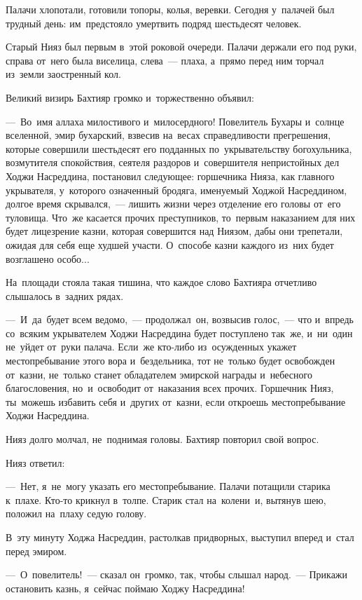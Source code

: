 \documentclass[12pt,a4paper]{book}
\begin{document}
Палачи хлопотали, готовили топоры, колья, веревки. Сегодня у~палачей был трудный день: им~предстояло умертвить подряд шестьдесят человек.

Старый Нияз был первым в~этой роковой очереди. Палачи держали его под руки, справа от~него была виселица, слева~— плаха, а~прямо перед ним торчал из~земли заостренный кол.

Великий визирь Бахтияр громко и~торжественно объявил:

—~Во~имя аллаха милостивого и~милосердного! Повелитель Бухары и~солнце вселенной, эмир бухарский, взвесив на~весах справедливости прегрешения, которые совершили шестьдесят его подданных по~укрывательству богохульника, возмутителя спокойствия, сеятеля раздоров и~совершителя непристойных дел Ходжи Насреддина, постановил следующее: горшечника Нияза, как главного укрывателя, у~которого означенный бродяга, именуемый Ходжой Насреддином, долгое время скрывался,~— лишить жизни через отделение его головы от~его туловища. Что~же касается прочих преступников, то~первым наказанием для них будет лицезрение казни, которая совершится над Ниязом, дабы они трепетали, ожидая для себя еще худшей участи. О~способе казни каждого из~них будет возглашено особо...

На~площади стояла такая тишина, что каждое слово Бахтияра отчетливо слышалось в~задних рядах.

—~И~да~будет всем ведомо,~— продолжал~он, возвысив голос,~— что и~впредь со~всяким укрывателем Ходжи Насреддина будет поступлено так~же, и~ни~один не~уйдет от~руки палача. Если~же кто-либо из~осужденных укажет местопребывание этого вора и~бездельника, тот не~только будет освобожден от~казни, не~только станет обладателем эмирской награды и~небесного благословения, но~и~освободит от~наказания всех прочих. Горшечник Нияз, ты~можешь избавить себя и~других от~казни, если откроешь местопребывание Ходжи Насреддина.

Нияз долго молчал, не~поднимая головы. Бахтияр повторил свой вопрос.

Нияз ответил:

—~Нет, я~не~могу указать его местопребывание. Палачи потащили старика к~плахе. Кто-то крикнул в~толпе. Старик стал на~колени~и, вытянув шею, положил на~плаху седую голову.

В~эту минуту Ходжа Насреддин, растолкав придворных, выступил вперед и~стал перед эмиром.

—~О~повелитель!~— сказал он~громко, так, чтобы слышал народ.~— Прикажи остановить казнь, я~сейчас поймаю Ходжу Насреддина!
\end{document}
